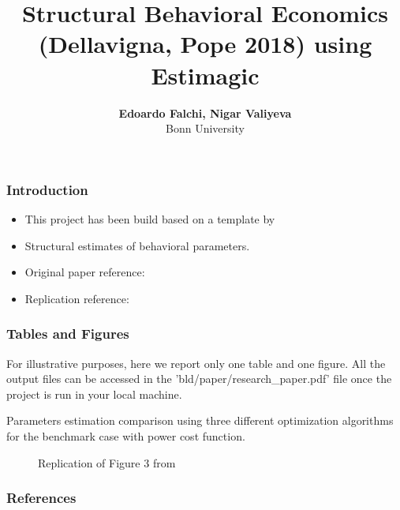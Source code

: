 \documentclass[11pt]{beamer}
\begin{document}
\title{Structural Behavioral Economics (Dellavigna, Pope 2018) using Estimagic}

\author[Edoardo Falchi, Nigar Valiyeva]
{
{\bf Edoardo Falchi, Nigar Valiyeva}\\
{\small Bonn University}\\[1ex]
}


\begin{frame}
    \titlepage
    \note{~}
\end{frame}


\begin{frame}[t]
    \frametitle{Introduction}
    \begin{itemize}
        \item<+-> This project has been build based on a template by \cite{GaudeckerEconProjectTemplates}
                \item<+-> Structural estimates of behavioral parameters.
        \item<+-> Original paper reference: \cite{dellavigna2018motivates}
        \item<+-> Replication reference: \cite{PozziNunnari}
    \end{itemize}
    \note{~}
\end{frame}

\begin{frame}[t]
    \frametitle{Tables and Figures}
    For illustrative purposes, here we report only one table and one figure. All the output files can be accessed in the 'bld/paper/research\_paper.pdf' file once the project is run in your local machine.
    
\begin{table}
\scalebox{0.75}{}
\caption{Parameters estimation comparison using three different optimization algorithms for the benchmark case with power cost function.}
\end{table}
\end{frame}

\begin{frame}[t]
\begin{figure}
\caption{Replication of Figure 3 from \cite{dellavigna2018motivates}}
\end{figure}
\end{frame}


 {
    \begin{frame}
        \frametitle{}
    \end{frame}

}

\begin{frame}[allowframebreaks]
    \frametitle{References}

    \renewcommand{\bibfont}{\normalfont\footnotesize}
    \printbibliography

\end{frame}
\end{document}
